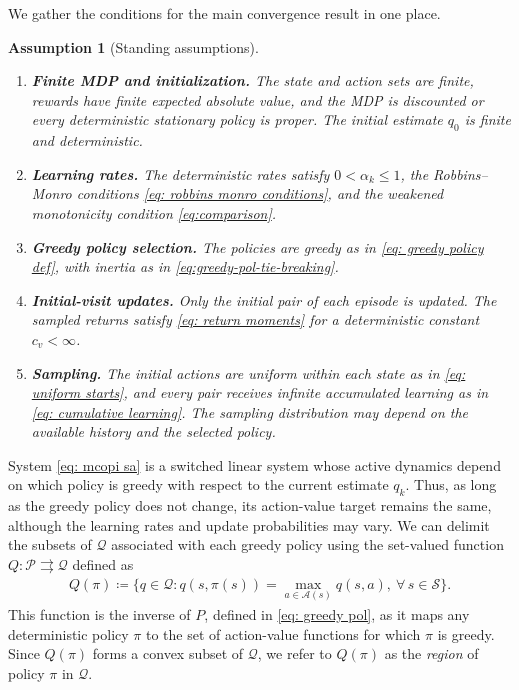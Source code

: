 \documentclass[twoside,11pt]{article}
\newtheorem{assumption}[assumption]{Assumption}
\newcommand{\qset}{\mathcal{Q}}
\newcommand{\aset}{\mathcal{A}}
\newcommand{\sset}{\mathcal{S}}
\newcommand{\polset}{\mathcal{P}}
\newcommand{\pol}{\pi}
\newcommand{\graval}{Q}
\DeclareRobustCommand{\reviewbarstart}{%
  \ifhmode %
    \vadjust{\vbox to 0pt{%
      \vskip-\ht\strutbox %
      \vskip-\dp\strutbox %
      \cbstart[\changebarwidth] %
      \vss %
    }}%
  \else %
    \cbstart[\changebarwidth]%
  \fi %
} %
\providecommand{\DIFadd}[1]{#1} %
\providecommand{\DIFaddbegin}{\reviewbarstart} %
\providecommand{\DIFaddend}{\protect\cbend} %
\def\DIFadd#1{#1}%
\def\DIFaddbegin{}%
\def\DIFaddend{}%
\begin{document}
\DIFadd{We gather the conditions for the main convergence result in one place}\DIFaddend .

\begin{assumption}[Standing assumptions]
\label{asp: standing}
\phantom{Assume}
\begin{enumerate}[label=(\arabic*)]
             \item \textbf{ \DIFaddbegin \DIFadd{Finite MDP and initialization}\DIFaddend .} The  \DIFaddbegin \DIFadd{state and action sets are finite, rewards have finite expected absolute value, and the MDP is discounted or every deterministic stationary policy is proper. The initial estimate $q_0$ is finite and deterministic.
}\DIFaddend \item \DIFaddbegin \DIFadd{\textbf{Learning rates.} The deterministic rates satisfy $0<\alpha_k\le1$, the Robbins--Monro conditions \eqref{eq: robbins monro conditions}, and the weakened monotonicity condition \eqref{eq:comparison}.
}\item \DIFaddend \textbf{ \DIFaddbegin \DIFadd{Greedy policy selection}\DIFaddend .} The  \DIFaddbegin \DIFadd{policies are greedy as in \eqref{eq: greedy policy def}, with inertia as in \eqref{eq:greedy-pol-tie-breaking}.
}\DIFaddend \item \textbf{ \DIFaddbegin \DIFadd{Initial-visit updates}\DIFaddend . \DIFaddbegin } \DIFadd{Only the initial pair of each episode is updated. The sampled returns satisfy \eqref{eq: return moments} for a deterministic constant $c_v<\infty$.
}\item \DIFadd{\textbf{Sampling.} The initial actions are uniform within each state as in \eqref{eq: uniform starts}, and every pair receives infinite accumulated learning as in \eqref{eq: cumulative learning}. The sampling distribution may depend on the available history and the selected policy.
}\DIFaddend \end{enumerate}
\end{assumption}

 System \eqref{eq: mcopi sa} is a switched linear system whose active dynamics depend on which policy is greedy with respect to the current estimate $q_k$.
Thus, as long as the greedy policy does not change,  \DIFaddbegin \DIFadd{its action-value target remains the same, although the learning rates and update probabilities may vary.
}\DIFaddend We can delimit the  \DIFaddbegin \DIFadd{subsets }\DIFaddend of $\qset$  \DIFaddbegin \DIFadd{associated with each greedy policy }\DIFaddend using the set-valued function $\graval : \polset \rightrightarrows \qset$ defined as
\begin{align}
\label{eq: greedy action values}
    \graval(\pol) \coloneqq \big\{ q \in \qset : q(s, \pol(s)) = \max_{a \in \aset(s)} q(s,a), \ \forall \, s \in \sset \big\} .
\end{align}
This function is the inverse of $P$, defined in \eqref{eq: greedy pol}, as it maps any deterministic policy $\pol$ to the set of action-value functions for which $\pol$ is greedy.
Since $\graval(\pol)$ forms a convex subset of $\qset$, we refer to $\graval(\pol)$ as the \textit{region} of policy $\pol$ in $\qset$.
\end{document}
